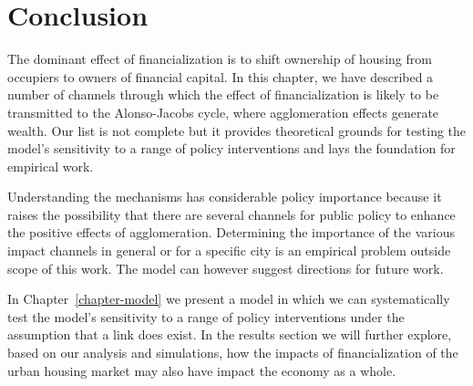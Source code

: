 \section{Conclusion}

The dominant effect of financialization is to shift ownership of housing from occupiers to owners of financial capital. In this chapter, we have described a number of channels through which the effect of financialization is likely to be transmitted to the Alonso-Jacobs cycle, where agglomeration effects generate wealth. Our list is not complete but it provides theoretical grounds for testing the model's sensitivity to a range of policy interventions and lays the foundation for empirical work.  

Understanding the mechanisms has considerable policy importance because it raises the possibility that there are several channels for public policy to enhance the positive effects of agglomeration. Determining the importance of the various impact channels in general or for a specific city is an empirical problem  outside scope of this work. %
The model can however suggest directions for future work.

In  Chapter~\ref{chapter-model} we present a model in which we can systematically test the model's sensitivity to a range of policy interventions under the assumption that a link does exist. %
In the results section we will further explore, based on our analysis and simulations, how the %
impacts of financialization of the urban housing market may also have impact %
the economy as a whole. 







